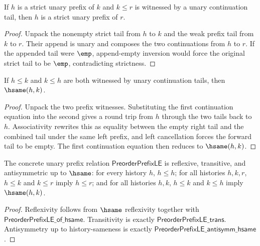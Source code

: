 \begin{theorem}
\label{thm:nat-unary-strict-prefix-right-extension}
If $h$ is a strict unary prefix of $k$ and $k\le r$ is witnessed by a unary
continuation tail, then $h$ is a strict unary prefix of $r$.
\end{theorem}
\begin{proof}
Unpack the nonempty strict tail from $h$ to $k$ and the weak prefix tail from
$k$ to $r$. Their append is unary and composes the two continuations from
$h$ to $r$. If the appended tail were $\emp$, append-empty inversion would
force the original strict tail to be $\emp$, contradicting strictness.
\end{proof}

\begin{theorem}
\label{thm:preorder-prefix-le-antisymm-hsame}
If \(h\le k\) and \(k\le h\) are both witnessed by unary continuation tails,
then \(\hsame(h,k)\).
\end{theorem}
\begin{proof}
Unpack the two prefix witnesses. Substituting the first continuation equation
into the second gives a round trip from \(h\) through the two tails back to
\(h\). Associativity rewrites this as equality between the empty right tail and
the combined tail under the same left prefix, and left cancellation forces the
forward tail to be empty. The first continuation equation then reduces to
\(\hsame(h,k)\).
\end{proof}

\begin{theorem}
\label{thm:preorder-prefix-order-laws-hsame}
The concrete unary prefix relation $\mathsf{PreorderPrefixLE}$ is reflexive,
transitive, and antisymmetric up to $\hsame$: for every history $h$,
$h\le h$; for all histories $h,k,r$, $h\le k$ and $k\le r$ imply
$h\le r$; and for all histories $h,k$, $h\le k$ and $k\le h$ imply
$\hsame(h,k)$.
\end{theorem}
\begin{proof}
Reflexivity follows from $\hsame$ reflexivity together with
$\mathsf{PreorderPrefixLE\_of\_hsame}$. Transitivity is exactly
$\mathsf{PreorderPrefixLE\_trans}$. Antisymmetry up to history-sameness is
exactly $\mathsf{PreorderPrefixLE\_antisymm\_hsame}$.
\end{proof}

